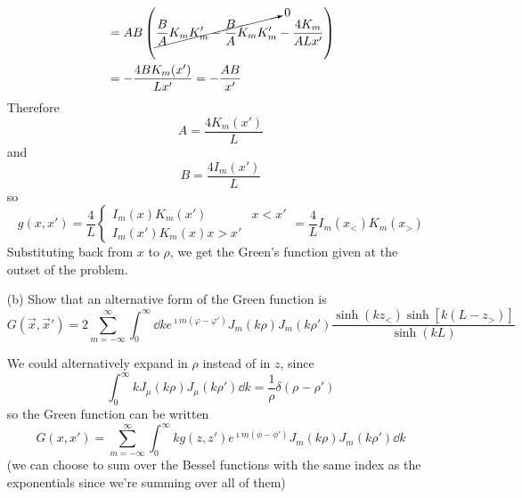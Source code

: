 \documentclass[a4paper,twoside]{article}
\begin{document}
\begin{itemize}
\begin{tcolorbox}[breakable]
\begin{align}
                &= AB \left(\cancelto{0}{\frac{B}{A} K_mK'_m - \frac{B}{A} K_mK'_m} - \frac{4 K_m}{A L x'} \right)\\
                &= -\frac{4 B K_m(x')}{Lx'} = - \frac{AB}{x'}
            \end{align}
            Therefore
            \begin{equation}
                A = \frac{4 K_m(x')}{L}
            \end{equation}
            and 
            \begin{equation}
                B = \frac{4 I_m(x')}{L}
            \end{equation}
            so
            \begin{equation}
                g(x,x') = \frac{4}{L} \begin{cases} I_m(x)K_m(x') & x<x'\\ I_m(x')K_m(x) x>x' \end{cases} = \frac{4}{L} I_m(x_<)K_m(x_>)
            \end{equation}
            Substituting back from $ x $ to $ \rho $, we get the Green's function given at the outset of the problem.
        \end{tcolorbox}
    \item[(b)] Show that an alternative form of the Green function is
        \begin{equation}
            G( \vec{x}, \vec{x}' ) = 2 \sum_{m=- \infty}^{\infty} \int_0^\infty \dd{k} e^{\imath m (\varphi - \varphi')} J_m(k \rho)J_m(k \rho') \frac{\sinh(kz_<)\sinh[k(L-z_>)]}{\sinh(kL)}
        \end{equation}
        \begin{tcolorbox}[breakable]
            We could alternatively expand in $\rho$ instead of in $ z $, since
            \begin{equation}
                \int_{0}^{\infty} kJ_\mu(k \rho)J_\mu(k \rho') \dd{k} = \frac{1}{\rho} \delta(\rho-\rho')
            \end{equation}
            so the Green function can be written
            \begin{equation}
                G(x,x') = \sum_{m=- \infty}^{\infty} \int_0^{\infty} k g(z,z') e^{\imath m (\phi-\phi')} J_m(k \rho)J_m(k \rho') \dd{k} 
            \end{equation}
            (we can choose to sum over the Bessel functions with the same index as the exponentials since we're summing over all of them)


\end{tcolorbox}
\end{itemize}
\end{document}
